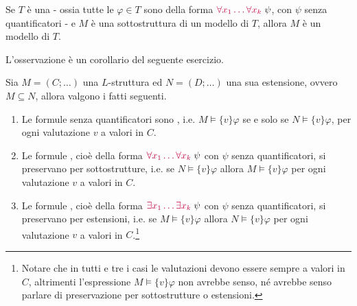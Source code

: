 \begin{remark}
    Se $T$ è una  - ossia tutte le $\varphi \in T$ sono della forma $\textcolor{purple}{\forall x_1 \ldots \forall x_k} \; \psi$,
    con $\psi$ senza quantificatori - e $M$ è una sottostruttura di un modello di $T$, allora $M$ è un modello di $T$.
\end{remark}

L'osservazione è un corollario del seguente esercizio.

\begin{exercise}
    Sia $M = (C; \ldots)$ una $L$-struttura ed $N = (D; \ldots)$ una sua estensione, ovvero $M \subseteq N$, allora valgono i fatti seguenti.
    \begin{enumerate}
        \item Le formule senza quantificatori sono , i.e. $M \models\{v\} \varphi$ se e solo se $N \models\{v\} \varphi$, per ogni valutazione $v$ a valori in $C$.
        \item Le formule , cioè della forma $\textcolor{purple}{\forall x_1 \ldots \forall x_k} \; \psi$ con $\psi$ senza quantificatori, si preservano per sottostrutture, i.e. se $N \models \{v\} \varphi$ allora $M \models \{v\} \varphi$ per ogni valutazione $v$ a valori in $C$.
        \item Le formule , cioè della forma $\textcolor{purple}{\exists x_1 \ldots \exists x_k} \; \psi$ con $\psi$ senza quantificatori, si preservano per estensioni, i.e. se $M \models \{v\} \varphi$ allora $N \models \{v\} \varphi$ per ogni valutazione $v$ a valori in $C$.\footnote{Notare che in tutti e tre i casi le valutazioni devono essere sempre a valori in $C$,
        altrimenti l'espressione $M \models \{v\} \varphi$ non avrebbe senso, né avrebbe senso parlare di preservazione per sottostrutture o estensioni.}
    \end{enumerate}
\end{exercise}

